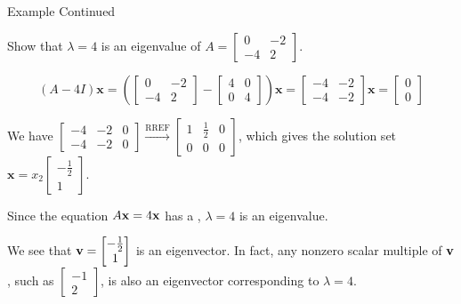 \documentclass[xcolor=dvipsnames,aspectratio=169,t]{beamer}
\begin{document}
\begin{frame}{Example Continued}
  \medskip
  
  Show that $\lambda = 4$ is an eigenvalue of $A = \begin{bmatrix} 0 & -2 \\ -4 & 2 \end{bmatrix}$.
  \medskip

  \[ (A - 4I) \mathbf{x} = \left( \begin{bmatrix} 0 & -2 \\ -4 & 2 \end{bmatrix} -  \begin{bmatrix} 4 & 0 \\ 0 & 4 \end{bmatrix} \right) \mathbf{x} = \begin{bmatrix} -4 & -2 \\ -4 & -2 \end{bmatrix}  \mathbf{x}= \begin{bmatrix} 0 \\ 0 \end{bmatrix} \]
  \medskip

  \pause
  We have $\begin{bmatrix} -4 & -2 & 0 \\ -4 & -2 & 0 \end{bmatrix} \xrightarrow{\text{RREF}} \begin{bmatrix} 1 &  \frac{1}{2} & 0 \\ 0 & 0 & 0 \end{bmatrix}$, which gives the solution set $\mathbf{x} = x_2 \begin{bmatrix} -\frac{1}{2} \\ 1 \end{bmatrix}$.
  \bs

  \pause
  Since the equation \alert{$A\mathbf{x} = 4\mathbf{x}$} has a , $\lambda =4$ is an \alert{eigenvalue}.
  \bigskip
  
  We see that $\mathbf{v} =  \begin{bmatrix} -\frac{1}{2} \\ 1 \end{bmatrix}$ is an \alert{eigenvector}. In fact, any nonzero scalar multiple of $\mathbf{v}$, such as
  $\begin{bmatrix} -1 \\ 2 \end{bmatrix}$, is also an eigenvector corresponding to $\lambda = 4$.

\end{frame}
\end{document}

